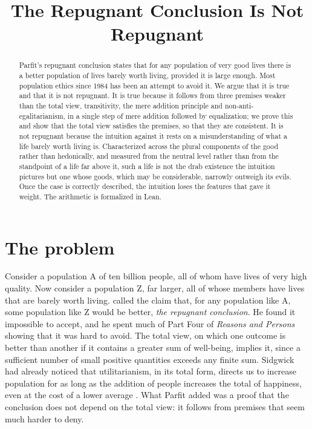 \documentclass{situationist-preprint}
\title{The Repugnant Conclusion Is Not Repugnant}
\begin{document}
\maketitle

\begin{abstract}
Parfit's repugnant conclusion states that for any population of very good lives there is a better population of lives barely worth living, provided it is large enough. Most population ethics since 1984 has been an attempt to avoid it. We argue that it is true and that it is not repugnant. It is true because it follows from three premises weaker than the total view, transitivity, the mere addition principle and non-anti-egalitarianism, in a single step of mere addition followed by equalization; we prove this and show that the total view satisfies the premises, so that they are consistent. It is not repugnant because the intuition against it rests on a misunderstanding of what a life barely worth living is. Characterized across the plural components of the good rather than hedonically, and measured from the neutral level rather than from the standpoint of a life far above it, such a life is not the drab existence the intuition pictures but one whose goods, which may be considerable, narrowly outweigh its evils. Once the case is correctly described, the intuition loses the features that gave it weight. The arithmetic is formalized in Lean.
\end{abstract}

\section{The problem}

Consider a population A of ten billion people, all of whom have lives of very high quality. Now consider a population Z, far larger, all of whose members have lives that are barely worth living. \citet[388]{Parfit1984} called the claim that, for any population like A, some population like Z would be better, \emph{the repugnant conclusion}. He found it impossible to accept, and he spent much of Part Four of \emph{Reasons and Persons} showing that it was hard to avoid. The total view, on which one outcome is better than another if it contains a greater sum of well-being, implies it, since a sufficient number of small positive quantities exceeds any finite sum. Sidgwick had already noticed that utilitarianism, in its total form, directs us to increase population for as long as the addition of people increases the total of happiness, even at the cost of a lower average \citep[Book IV, ch.~1, \S 2]{Sidgwick1907}. What Parfit added was a proof that the conclusion does not depend on the total view: it follows from premises that seem much harder to deny.
\end{document}
